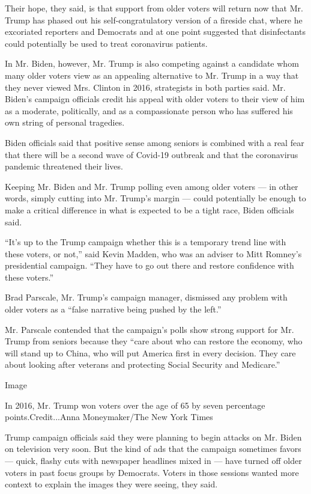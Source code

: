 Their hope, they said, is that support from older voters will return now
that Mr. Trump has phased out his self-congratulatory version of a
fireside chat, where he excoriated reporters and Democrats and at one
point suggested that disinfectants could potentially be used to treat
coronavirus patients.

In Mr. Biden, however, Mr. Trump is also competing against a candidate
whom many older voters view as an appealing alternative to Mr. Trump in
a way that they never viewed Mrs. Clinton in 2016, strategists in both
parties said. Mr. Biden's campaign officials credit his appeal with
older voters to their view of him as a moderate, politically, and as a
compassionate person who has suffered his own string of personal
tragedies.

Biden officials said that positive sense among seniors is combined with
a real fear that there will be a second wave of Covid-19 outbreak and
that the coronavirus pandemic threatened their lives.

Keeping Mr. Biden and Mr. Trump polling even among older voters --- in
other words, simply cutting into Mr. Trump's margin --- could
potentially be enough to make a critical difference in what is expected
to be a tight race, Biden officials said.

``It's up to the Trump campaign whether this is a temporary trend line
with these voters, or not,'' said Kevin Madden, who was an adviser to
Mitt Romney's presidential campaign. ``They have to go out there and
restore confidence with these voters.''

Brad Parscale, Mr. Trump's campaign manager, dismissed any problem with
older voters as a ``false narrative being pushed by the left.''

Mr. Parscale contended that the campaign's polls show strong support for
Mr. Trump from seniors because they ``care about who can restore the
economy, who will stand up to China, who will put America first in every
decision. They care about looking after veterans and protecting Social
Security and Medicare.''

Image

In 2016, Mr. Trump won voters over the age of 65 by seven percentage
points.Credit...Anna Moneymaker/The New York Times

Trump campaign officials said they were planning to begin attacks on Mr.
Biden on television very soon. But the kind of ads that the campaign
sometimes favors --- quick, flashy cuts with newspaper headlines mixed
in --- have turned off older voters in past focus groups by Democrats.
Voters in those sessions wanted more context to explain the images they
were seeing, they said.

